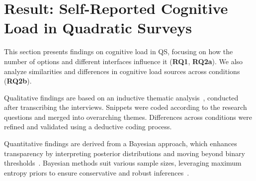 \section{Result: Self-Reported Cognitive Load in Quadratic Surveys}
\label{sec:cog}
This section presents findings on cognitive load in QS, focusing on how the number of options and different interfaces influence it (\textbf{RQ1}, \textbf{RQ2a}). We also analyze similarities and differences in cognitive load sources across conditions (\textbf{RQ2b}).

Qualitative findings are based on an inductive thematic analysis~\cite{olsonWaysKnowingHCI2014}, conducted after transcribing the interviews. Snippets were coded according to the research questions and merged into overarching themes. Differences across conditions were refined and validated using a deductive coding process.

Quantitative findings are derived from a Bayesian approach, which enhances transparency by interpreting posterior distributions and moving beyond binary thresholds~\cite{kay2016researcher}. Bayesian methods suit various sample sizes, leveraging maximum entropy priors to ensure conservative and robust inferences~\cite{mcelreath2018statistical}.

